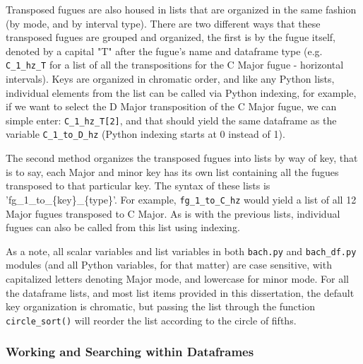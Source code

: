 Transposed fugues are also housed in lists that are organized in the
same fashion (by mode, and by interval type). There are two different
ways that these transposed fugues are grouped and organized, the first
is by the fugue itself, denoted by a capital "T" after the fugue's name
and dataframe type (e.g. \texttt{C\_1\_hz\_T} for a list of all the
transpositions for the C Major fugue - horizontal intervals). Keys are
organized in chromatic order, and like any Python lists, individual
elements from the list can be called via Python indexing, for example,
if we want to select the D Major transposition of the C Major fugue, we
can simple enter: \texttt{C\_1\_hz\_T{[}2{]}}, and that should yield the
same dataframe as the variable \texttt{C\_1\_to\_D\_hz} (Python indexing
starts at 0 instead of 1).

The second method organizes the transposed fugues into lists by way of
key, that is to say, each Major and minor key has its own list
containing all the fugues transposed to that particular key. The syntax
of these lists is 'fg\_1\_to\_\{key\}\_\{type\}'. For example,
\texttt{fg\_1\_to\_C\_hz} would yield a list of all 12 Major fugues
transposed to C Major. As is with the previous lists, individual fugues
can also be called from this list using indexing.

As a note, all scalar variables and list variables in both
\texttt{bach.py} and \texttt{bach\_df.py} modules (and all Python
variables, for that matter) are case sensitive, with capitalized letters
denoting Major mode, and lowercase for minor mode. For all the dataframe
lists, and most list items provided in this dissertation, the default
key organization is chromatic, but passing the list through the function
\texttt{circle\_sort()} will reorder the list according to the circle of
fifths.

\subsubsection{Working and Searching within
Dataframes}\label{working-and-searching-within-dataframes}

